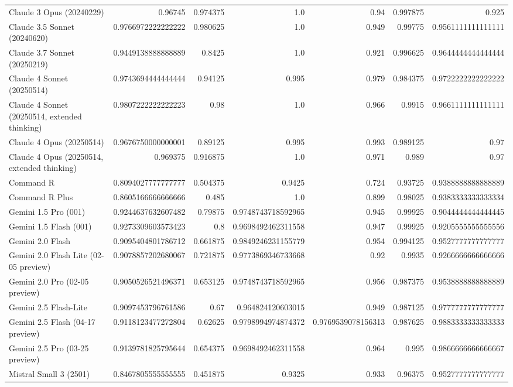 \begin{table}[htp]
{\begin{tabular}{lrrrrrr}
Claude 3 Opus (20240229) & 0.96745 & 0.974375 & 1.0 & 0.94 & 0.997875 & 0.925 \\
Claude 3.5 Sonnet (20240620) & 0.9766972222222222 & 0.980625 & 1.0 & 0.949 & 0.99775 & 0.9561111111111111 \\
Claude 3.7 Sonnet (20250219) & 0.9449138888888889 & 0.8425 & 1.0 & 0.921 & 0.996625 & 0.9644444444444444 \\
Claude 4 Sonnet (20250514) & 0.9743694444444444 & 0.94125 & 0.995 & 0.979 & 0.984375 & 0.9722222222222222 \\
Claude 4 Sonnet (20250514, extended thinking) & 0.9807222222222223 & 0.98 & 1.0 & 0.966 & 0.9915 & 0.9661111111111111 \\
Claude 4 Opus (20250514) & 0.9676750000000001 & 0.89125 & 0.995 & 0.993 & 0.989125 & 0.97 \\
Claude 4 Opus (20250514, extended thinking) & 0.969375 & 0.916875 & 1.0 & 0.971 & 0.989 & 0.97 \\
Command R & 0.8094027777777777 & 0.504375 & 0.9425 & 0.724 & 0.93725 & 0.9388888888888889 \\
Command R Plus & 0.8605166666666666 & 0.485 & 1.0 & 0.899 & 0.98025 & 0.9383333333333334 \\
Gemini 1.5 Pro (001) & 0.9244637632607482 & 0.79875 & 0.9748743718592965 & 0.945 & 0.99925 & 0.9044444444444445 \\
Gemini 1.5 Flash (001) & 0.9273309603573423 & 0.8 & 0.9698492462311558 & 0.947 & 0.99925 & 0.9205555555555556 \\
Gemini 2.0 Flash & 0.9095404801786712 & 0.661875 & 0.9849246231155779 & 0.954 & 0.994125 & 0.9527777777777777 \\
Gemini 2.0 Flash Lite (02-05 preview) & 0.9078857202680067 & 0.721875 & 0.9773869346733668 & 0.92 & 0.9935 & 0.9266666666666666 \\
Gemini 2.0 Pro (02-05 preview) & 0.9050526521496371 & 0.653125 & 0.9748743718592965 & 0.956 & 0.987375 & 0.9538888888888889 \\
Gemini 2.5 Flash-Lite & 0.9097453796761586 & 0.67 & 0.964824120603015 & 0.949 & 0.987125 & 0.9777777777777777 \\
Gemini 2.5 Flash (04-17 preview) & 0.9118123477272804 & 0.62625 & 0.9798994974874372 & 0.9769539078156313 & 0.987625 & 0.9883333333333333 \\
Gemini 2.5 Pro (03-25 preview) & 0.9139781825795644 & 0.654375 & 0.9698492462311558 & 0.964 & 0.995 & 0.9866666666666667 \\
Mistral Small 3 (2501) & 0.8467805555555555 & 0.451875 & 0.9325 & 0.933 & 0.96375 & 0.9527777777777777 \\

\end{tabular}}
\end{table}
